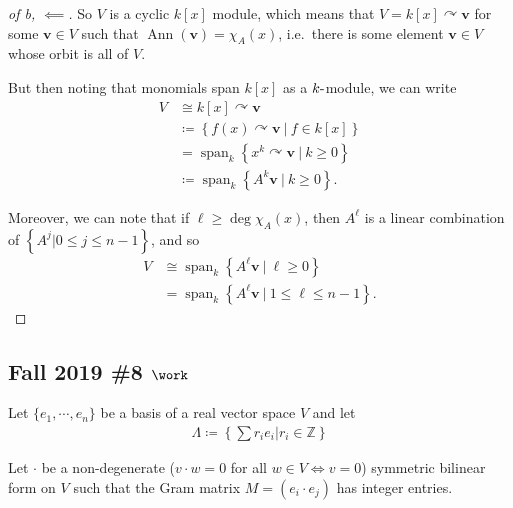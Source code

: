 \begin{solution}
\begin{proof}[of b, $\impliedby$]
So \(V\) is a cyclic \(k[x]\) module, which means that
\(V = k[x]\curvearrowright\mathbf{v}\) for some \(\mathbf{v}\in V\) such
that \(\operatorname{Ann}(\mathbf{v}) = \chi_A(x)\), i.e.~there is some
element \(\mathbf{v}\in V\) whose orbit is all of \(V\).

But then noting that monomials span \(k[x]\) as a \(k{\hbox{-}}\)module,
we can write
\begin{align*}
V &\cong
k[x] \curvearrowright\mathbf{v} \\
&\coloneqq\left\{{f(x) \curvearrowright\mathbf{v} {~\mathrel{\Big|}~}f \in k[x]}\right\} \\
&= {\operatorname{span}}_k \left\{{x^k \curvearrowright\mathbf{v} {~\mathrel{\Big|}~}k \geq 0}\right\} \\
&\coloneqq{\operatorname{span}}_k \left\{{A^k\mathbf{v} {~\mathrel{\Big|}~}k \geq 0}\right\}
.\end{align*}

Moreover, we can note that if \(\ell \geq \deg \chi_A(x)\), then
\(A^\ell\) is a linear combination of
\(\left\{{A^j \mathrel{\Big|}0 \leq j \leq n-1}\right\}\), and so
\begin{align*}
V &\cong {\operatorname{span}}_k \left\{{A^\ell\mathbf{v} {~\mathrel{\Big|}~}\ell \geq 0}\right\} \\
&= {\operatorname{span}}_k \left\{{A^\ell \mathbf{v} {~\mathrel{\Big|}~}1 \leq \ell \leq n-1}\right\}
.\end{align*}

\end{proof}

\end{solution}

\hypertarget{fall-2019-8-work}{%
\subsection{\texorpdfstring{Fall 2019 \#8
\(\work\)}{Fall 2019 \#8 \textbackslash work}}\label{fall-2019-8-work}}

Let \(\{e_1, \cdots, e_n \}\) be a basis of a real vector space \(V\)
and let
\begin{align*}
\Lambda \coloneqq\left\{{ \sum r_i e_i \mathrel{\Big|}r_i \in {\mathbb{Z}}}\right\}
\end{align*}

Let \(\cdot\) be a non-degenerate (\(v \cdot w = 0\) for all
\(w \in V \iff v = 0\)) symmetric bilinear form on \(V\) such that the
Gram matrix \(M = (e_i \cdot e_j )\) has integer entries.

